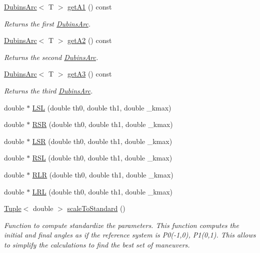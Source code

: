\begin{DoxyCompactItemize}
\mbox{\hyperlink{class_dubins_arc}{Dubins\+Arc}}$<$ T $>$ \mbox{\hyperlink{class_dubins_a8ef23becf55e74907b7b9eaa00431fa7}{get\+A1}} () const
\begin{DoxyCompactList}\small\item\em Returns the first {\ttfamily \mbox{\hyperlink{class_dubins_arc}{Dubins\+Arc}}}. \end{DoxyCompactList}\item 
\mbox{\hyperlink{class_dubins_arc}{Dubins\+Arc}}$<$ T $>$ \mbox{\hyperlink{class_dubins_a0291f2dc5b8225c0d85013d42749dd4b}{get\+A2}} () const
\begin{DoxyCompactList}\small\item\em Returns the second {\ttfamily \mbox{\hyperlink{class_dubins_arc}{Dubins\+Arc}}}. \end{DoxyCompactList}\item 
\mbox{\hyperlink{class_dubins_arc}{Dubins\+Arc}}$<$ T $>$ \mbox{\hyperlink{class_dubins_ae128ed13582151a7bd99c772c96d0402}{get\+A3}} () const
\begin{DoxyCompactList}\small\item\em Returns the third {\ttfamily \mbox{\hyperlink{class_dubins_arc}{Dubins\+Arc}}}. \end{DoxyCompactList}\item 
double $\ast$ \mbox{\hyperlink{class_dubins_a71a41035ec0b555fa0d386c6cbf2042f}{L\+SL}} (double th0, double th1, double \+\_\+kmax)
\item 
double $\ast$ \mbox{\hyperlink{class_dubins_ac7203da82ecbefb962e82efa02b005f7}{R\+SR}} (double th0, double th1, double \+\_\+kmax)
\item 
double $\ast$ \mbox{\hyperlink{class_dubins_a67df5f03a4bec3f6911898dc160d51ae}{L\+SR}} (double th0, double th1, double \+\_\+kmax)
\item 
double $\ast$ \mbox{\hyperlink{class_dubins_a168bfb98fd707750ebc509cfffd01c93}{R\+SL}} (double th0, double th1, double \+\_\+kmax)
\item 
double $\ast$ \mbox{\hyperlink{class_dubins_a3b05d5f9b3a6ca481224996660f3f8d0}{R\+LR}} (double th0, double th1, double \+\_\+kmax)
\item 
double $\ast$ \mbox{\hyperlink{class_dubins_a1e1503925ef99b85b208f96fb27c88f9}{L\+RL}} (double th0, double th1, double \+\_\+kmax)
\item 
\mbox{\hyperlink{class_tuple}{Tuple}}$<$ double $>$ \mbox{\hyperlink{class_dubins_afecc4ffa89c5f3952b1729edb87ac88c}{scale\+To\+Standard}} ()
\begin{DoxyCompactList}\small\item\em Function to compute standardize the parameters. This function computes the initial and final angles as if the reference system is P0(-\/1,0), P1(0,1). This allows to simplify the calculations to find the best set of maneuvers. \end{DoxyCompactList}\item 

\end{DoxyCompactItemize}
